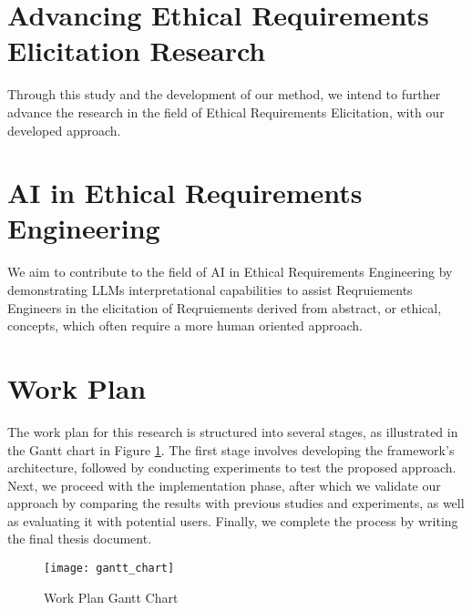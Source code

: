 \section{Advancing Ethical Requirements Elicitation Research}
Through this study and the development of our method, we intend to further advance the research in the field of Ethical Requirements Elicitation, with our developed approach.

\section{AI in Ethical Requirements Engineering}
We aim to contribute to the field of AI in Ethical Requirements Engineering by demonstrating LLMs interpretational capabilities to assist Reqruiements Engineers in the elicitation of
Reqruiements derived from abstract, or ethical, concepts, which often require a more human oriented approach.


\section{Work Plan}
The work plan for this research is structured into several stages, as illustrated in the Gantt chart in Figure \ref{fig:gantt_chart}. The first stage involves developing 
the framework's architecture, followed by conducting experiments to test the proposed approach. Next, we proceed with the implementation phase, after which we validate our approach by comparing the 
results with previous studies and experiments, as well as evaluating it with potential users. Finally, we complete the process by writing the final thesis document.

\begin{figure}[h]
  \centering
  \texttt{[image: gantt\_chart]}
  \caption{Work Plan Gantt Chart}
  \label{fig:gantt_chart}
  \end{figure}